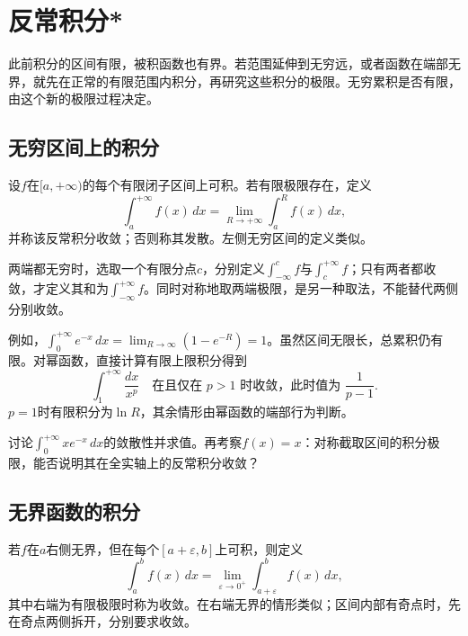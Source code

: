 \FloatBarrier
\newpage
\section{反常积分*}
\label{sec:calculus-improper-integrals}

此前积分的区间有限，被积函数也有界。若范围延伸到无穷远，或者函数在端部无界，就先在正常的有限范围内积分，再研究这些积分的极限。无穷累积是否有限，由这个新的极限过程决定。

\subsection{无穷区间上的积分}

\begin{definition}
设\(f\)在\([a,+\infty)\)的每个有限闭子区间上可积。若有限极限存在，定义
\begin{equation*}
 \int_a^{+\infty}f(x)\,dx=\lim_{R\to+\infty}\int_a^Rf(x)\,dx,
\end{equation*}
并称该{\heiti{}反常积分收敛}；否则称其发散。左侧无穷区间的定义类似。
\end{definition}

两端都无穷时，选取一个有限分点\(c\)，分别定义\(\int_{-\infty}^cf\)与\(\int_c^{+\infty}f\)；只有两者都收敛，才定义其和为\(\int_{-\infty}^{+\infty}f\)。同时对称地取两端极限，是另一种取法，不能替代两侧分别收敛。

例如，\(\int_0^{+\infty}e^{-x}\,dx=\lim_{R\to\infty}(1-e^{-R})=1\)。虽然区间无限长，总累积仍有限。对幂函数，直接计算有限上限积分得到
\begin{equation*}
 \int_1^{+\infty}\frac{dx}{x^p}
 \quad\text{在且仅在 }p>1\text{ 时收敛，此时值为 }\frac1{p-1}.
\end{equation*}
\(p=1\)时有限积分为\(\ln R\)，其余情形由幂函数的端部行为判断。

\begin{example}
讨论\(\int_0^{+\infty}xe^{-x}\,dx\)的敛散性并求值。再考察\(f(x)=x\)：对称截取区间的积分极限，能否说明其在全实轴上的反常积分收敛？
\end{example}

\subsection{无界函数的积分}

若\(f\)在\(a\)右侧无界，但在每个\([a+\varepsilon,b]\)上可积，则定义
\begin{equation*}
 \int_a^bf(x)\,dx=\lim_{\varepsilon\to0^+}\int_{a+\varepsilon}^bf(x)\,dx,
\end{equation*}
其中右端为有限极限时称为收敛。在右端无界的情形类似；区间内部有奇点时，先在奇点两侧拆开，分别要求收敛。

